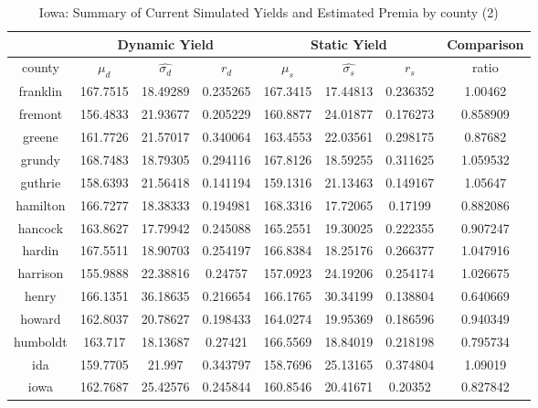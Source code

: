 \begin{table}[H]\centering
\caption{Iowa: Summary of Current Simulated Yields and Estimated Premia by county (2)}
\label{my-label}
\begin{tabular}{|c|ccc|ccc|c|}

\hline
\multicolumn{1}{|c}{} & \multicolumn{3}{|c}{Dynamic Yield} & \multicolumn{3}{|c}{Static Yield} & \multicolumn{1}{|c|}{Comparison}\\ 
\hline
county        & $\mu_d$ & $\hat{\sigma_d}$ & $r_d$ & $\mu_s$ & $\hat{\sigma_s}$ & $r_s$ & ratio \\
\hline

franklin      & 167.7515 & 18.49289       & 0.235265 & 167.3415 & 17.44813       & 0.236352 & 1.00462  \\
fremont       & 156.4833 & 21.93677       & 0.205229 & 160.8877 & 24.01877       & 0.176273 & 0.858909 \\
greene        & 161.7726 & 21.57017       & 0.340064 & 163.4553 & 22.03561       & 0.298175 & 0.87682  \\
grundy        & 168.7483 & 18.79305       & 0.294116 & 167.8126 & 18.59255       & 0.311625 & 1.059532 \\
guthrie       & 158.6393 & 21.56418       & 0.141194 & 159.1316 & 21.13463       & 0.149167 & 1.05647  \\
hamilton      & 166.7277 & 18.38333       & 0.194981 & 168.3316 & 17.72065       & 0.17199  & 0.882086 \\
hancock       & 163.8627 & 17.79942       & 0.245088 & 165.2551 & 19.30025       & 0.222355 & 0.907247 \\
hardin        & 167.5511 & 18.90703       & 0.254197 & 166.8384 & 18.25176       & 0.266377 & 1.047916 \\
harrison      & 155.9888 & 22.38816       & 0.24757  & 157.0923 & 24.19206       & 0.254174 & 1.026675 \\
henry         & 166.1351 & 36.18635       & 0.216654 & 166.1765 & 30.34199       & 0.138804 & 0.640669 \\
howard        & 162.8037 & 20.78627       & 0.198433 & 164.0274 & 19.95369       & 0.186596 & 0.940349 \\
humboldt      & 163.717  & 18.13687       & 0.27421  & 166.5569 & 18.84019       & 0.218198 & 0.795734 \\
ida           & 159.7705 & 21.997         & 0.343797 & 158.7696 & 25.13165       & 0.374804 & 1.09019  \\
iowa          & 162.7687 & 25.42576       & 0.245844 & 160.8546 & 20.41671       & 0.20352  & 0.827842 \\

\end{tabular}
\end{table}

